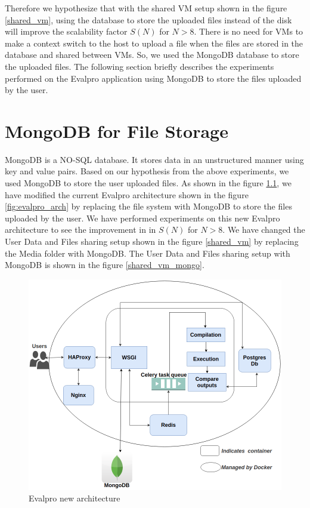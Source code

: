 \documentclass{iitbreport}
\begin{document}
Therefore we hypothesize that with the shared VM setup shown in the figure \ref{shared_vm},  using the database to store the uploaded files instead of the disk will improve the scalability factor $S(N)$ for $N>8$. There is no need for VMs to make a context switch to the host to upload a file when the files are stored in the database and shared between VMs. So, we used the MongoDB database to store the uploaded files. The following section briefly describes the experiments performed on the Evalpro application using MongoDB to store the files uploaded by the user.


\chapter{MongoDB for File Storage}\label{mongodb_filestorage}
MongoDB is a NO-SQL database. It stores data in an unstructured manner using key and value pairs. Based on our hypothesis from the above experiments, we used MongoDB to store the user uploaded files. As shown in the figure \ref{architecture_mongo}, we have modified the current Evalpro architecture shown in the figure \ref{fig:evalpro_arch} by replacing the file system with MongoDB to store the files uploaded by the user. We have performed experiments on this new Evalpro architecture to see the improvement in in $S(N)$ for $N>8$. We  have changed the User Data and Files sharing setup shown in the figure \ref{shared_vm} by replacing the Media folder with MongoDB. The User Data and Files sharing setup with MongoDB  is shown in the figure \ref{shared_vm_mongo}.

\begin{figure}[!htb]
  \centering
  \includegraphics[scale=0.45]{Images/evalpro-architecture_mongo.png}
  \caption{Evalpro new architecture}
  \label{architecture_mongo}
\end{figure}
\end{document}
